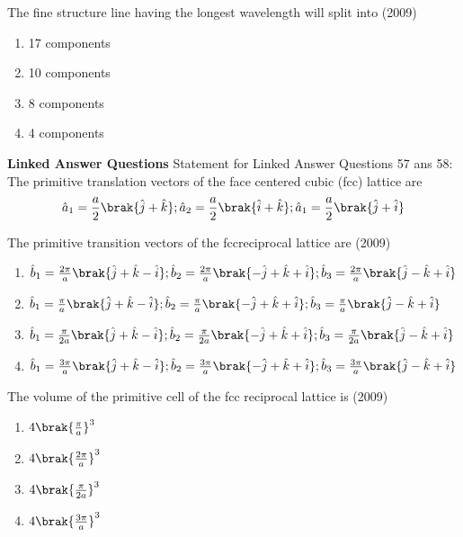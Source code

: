     \item[56.]  The fine structure line having the longest wavelength will split into \hfill (2009)
     \begin{enumerate}[label=(\Alph*)]
        \item  17 components
        \item  10 components
        \item  8 components
        \item  4 components
     \end{enumerate}
     \textbf{Linked Answer Questions}
     Statement for Linked Answer Questions 57 ans 58:
    The primitive translation vectors of the face centered cubic (fcc) lattice are 
    $$\hat{a}_1 = \frac{a}{2}\brak{\hat{j}+\hat{k}};\hat{a}_2 = \frac{a}{2}\brak{\hat{i}+\hat{k}};\hat{a}_1 = \frac{a}{2}\brak{\hat{j}+\hat{i}}$$
    \item[57.] The primitive transition vectors of the fccreciprocal lattice are \hfill (2009)
    \begin{enumerate}[label=(\Alph*)]
        \item $\hat{b}_1 = \frac{2\pi}{a}\brak{\hat{j}+\hat{k}-\hat{i}};\hat{b}_2 = \frac{2\pi}{a}\brak{-\hat{j}+\hat{k}+\hat{i}};\hat{b}_3 = \frac{2\pi}{a}\brak{\hat{j}-\hat{k}+\hat{i}}$
        \item $\hat{b}_1 = \frac{\pi}{a}\brak{\hat{j}+\hat{k}-\hat{i}};\hat{b}_2 = \frac{\pi}{a}\brak{-\hat{j}+\hat{k}+\hat{i}};\hat{b}_3 = \frac{\pi}{a}\brak{\hat{j}-\hat{k}+\hat{i}}$
        \item $\hat{b}_1 = \frac{\pi}{2a}\brak{\hat{j}+\hat{k}-\hat{i}};\hat{b}_2 = \frac{\pi}{2a}\brak{-\hat{j}+\hat{k}+\hat{i}};\hat{b}_3 = \frac{\pi}{2a}\brak{\hat{j}-\hat{k}+\hat{i}}$
        \item $\hat{b}_1 = \frac{3\pi}{a}\brak{\hat{j}+\hat{k}-\hat{i}};\hat{b}_2 = \frac{3\pi}{a}\brak{-\hat{j}+\hat{k}+\hat{i}};\hat{b}_3 = \frac{3\pi}{a}\brak{\hat{j}-\hat{k}+\hat{i}}$
    \end{enumerate}
    \item[58.] The volume of the primitive cell of the fcc reciprocal lattice is \hfill (2009)
    \begin{enumerate}[label=(\Alph*)]
        \item $4\brak{\frac{\pi}{a}}^3$
        \item $4\brak{\frac{2\pi}{a}}^3$
        \item $4\brak{\frac{\pi}{2a}}^3$
        \item $4\brak{\frac{3\pi}{a}}^3$
    \end{enumerate}
    
